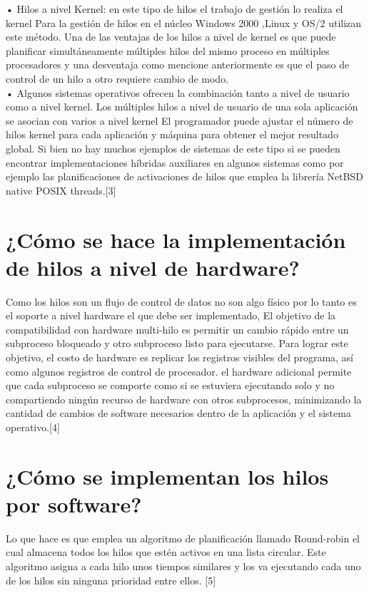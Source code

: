 \documentclass{article}
\begin{document}
•	Hilos a nivel Kernel: en este tipo de hilos el trabajo de gestión lo realiza el kernel Para la gestión de hilos en el núcleo Windows 2000 ,Linux y OS/2 utilizan este método. Una de las ventajas de los hilos a nivel de kernel es que puede planificar simultáneamente múltiples hilos del mismo proceso en múltiples procesadores y una desventaja como mencione anteriormente es que el paso de control de un hilo a otro requiere cambio de modo.\\


•	Algunos sistemas operativos ofrecen la combinación tanto a nivel de usuario como a nivel kernel. Los múltiples hilos a nivel de usuario de una sola aplicación se asocian con varios a nivel kernel El programador puede ajustar el número de hilos kernel para cada aplicación y máquina para obtener el mejor resultado global. Si bien no hay muchos ejemplos de sistemas de este tipo si se pueden encontrar implementaciones híbridas auxiliares en algunos sistemas como por ejemplo las planificaciones de activaciones de hilos que emplea la librería NetBSD native POSIX threads.[3]\\

\section*{¿Cómo se hace la implementación de hilos a nivel de hardware?}

Como los hilos son un flujo de control de datos no son algo físico por lo tanto es el soporte a nivel hardware el que debe ser implementado, El objetivo de la compatibilidad con hardware multi-hilo es permitir un cambio rápido entre un subproceso bloqueado y otro subproceso listo para ejecutarse. Para lograr este objetivo, el costo de hardware es replicar los registros visibles del programa, así como algunos registros de control de procesador. el hardware adicional permite que cada subproceso se comporte como si se estuviera ejecutando solo y no compartiendo ningún recurso de hardware con otros subprocesos, minimizando la cantidad de cambios de software necesarios dentro de la aplicación y el sistema operativo.[4]

\section*{¿Cómo se implementan los hilos por software?}

Lo que hace es que emplea un algoritmo de planificación llamado Round-robin el cual almacena todos los hilos que estén activos en una lista circular. Este algoritmo asigna a cada hilo unos tiempos similares y los va ejecutando cada uno de los hilos sin ninguna prioridad entre ellos. [5]\\
\end{document}
